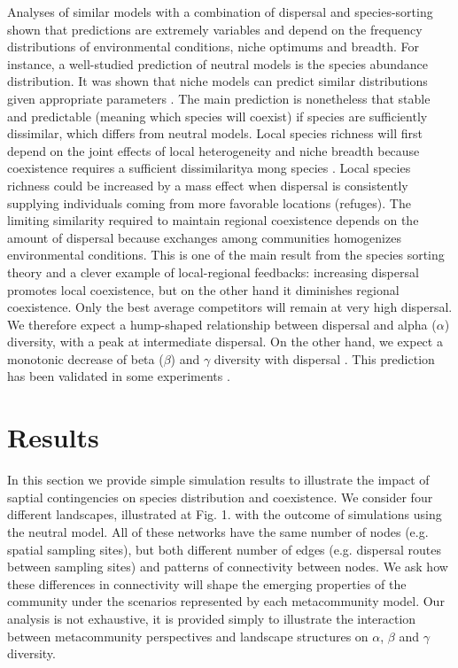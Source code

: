 \documentclass[12pt]{article}
\begin{document}
Analyses of similar models with a combination of dispersal and species-sorting
shown that predictions are extremely variables and depend on the frequency
distributions of environmental conditions, niche optimums and breadth. For
instance, a well-studied prediction of neutral models is the species abundance
distribution. It was shown that niche models can predict similar distributions
given appropriate parameters \parencite{Tilman2004,Gravel2006}. The main
prediction is nonetheless that stable and predictable (meaning which species
will coexist) if species are sufficiently dissimilar, which differs from neutral
models. Local species richness will first depend on the joint effects of local
heterogeneity and niche breadth because coexistence requires a sufficient
dissimilaritya mong species \parencite{Schwilk2005}. Local species richness
could be increased by a mass effect when dispersal is consistently supplying
individuals coming from more favorable locations (refuges). The limiting
similarity required to maintain regional coexistence depends on the amount of
dispersal because exchanges among communities homogenizes environmental
conditions. This is one of the main result from the species sorting theory and a
clever example of local-regional feedbacks: increasing dispersal promotes local
coexistence, but on the other hand it diminishes regional coexistence. Only the
best average competitors will remain at very high dispersal. We therefore expect
a hump-shaped relationship between dispersal and alpha ($\alpha$) diversity,
with a peak at intermediate dispersal. On the other hand, we expect a monotonic
decrease of beta ($\beta$) and $\gamma$ diversity with dispersal
\parencite{Mouquet2003}. This prediction has been validated in some experiments
\parencite{Venail2008, Logue2011}.

\section*{Results}

In this section we provide simple simulation results to illustrate the impact of
saptial contingencies on species distribution and coexistence. We consider four
different landscapes, illustrated at Fig. 1. with the outcome of simulations
using the neutral model. All of these networks have the same number of nodes
(e.g. spatial sampling sites), but both different number of edges (e.g.
dispersal routes between sampling sites) and patterns of connectivity between
nodes. We ask how these differences in connectivity will shape the emerging
properties of the community under the scenarios represented by each
metacommunity model. Our analysis is not exhaustive, it is provided simply to
illustrate the interaction between metacommunity perspectives and landscape
structures on $\alpha$, $\beta$ and $\gamma$ diversity.
\end{document}
